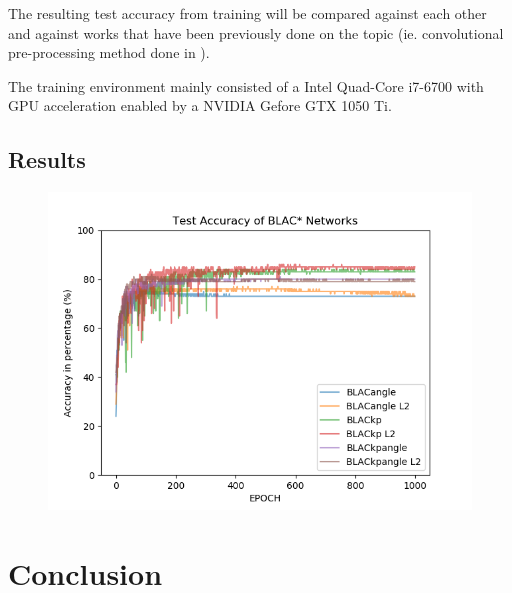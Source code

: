 \documentclass{article}
\begin{document}
The resulting test accuracy from training will be compared against each other and against works that have been previously done on the topic (ie. convolutional pre-processing method done in \citep{stienen2012computational} \citep{schindler2008recognizing}).

The training environment mainly consisted of a Intel Quad-Core i7-6700 with GPU acceleration enabled by a NVIDIA Gefore GTX 1050 Ti.

\subsection{Results}

\begin{figure}[h]
\centering
\includegraphics[scale=0.5]{te_acc}
\end{figure}

\section{Conclusion}

%
%
%
%
%
%
\end{document}
